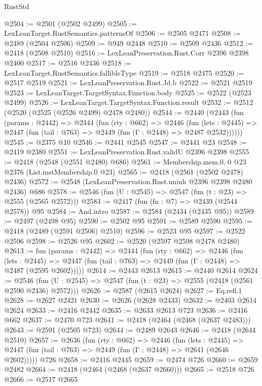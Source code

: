 \begin{lexlean}{RustStd}
\begin{coremodule}
@2504 := @2501 (@2502 @2499)
@2505 := LexLeanTarget.RustSemantics.patternsOf
@2506 := @2505 @2471
@2508 := @2489 (@2504 @2506)
@2509 := @949 @2448
@2510 := @2509 @2436
@2512 := @2418 (@2508 @2510)
@2516 := LexLeanPreservation.Rust.Corr @2396 @2398 @2400
@2517 := @2516 @2436
@2518 := LexLeanTarget.RustSemantics.fallibleType
@2519 := @2518 @2475
@2520 := @2517 @2519
@2521 := LexLeanPreservation.Rust.Jd.b
@2522 := @2521 @2519
@2523 := LexLeanTarget.TargetSyntax.Function.body
@2525 := @2522 (@2523 @2499)
@2526 := LexLeanTarget.TargetSyntax.Function.result
@2532 := @2512 (@2520 (@2525 (@2526 @2499) @2478 @2480))
@2544 := @2440
    (@2443
      (fun (params : @2442) =>
      @2444
        (fun (rty : @662) =>
        @2446
          (fun (lets : @2445) =>
          @2447 (fun (tail : @763) => @2449 (fun (Γ : @2448) => @2487 @2532))))))
@2545 := @2375 @10
@2546 := @2441 @2545
@2547 := @2441 @23
@2548 := @2419 @2380
@2551 := LexLeanPreservation.Rust.validU @2396 @2398
@2555 := @2418 (@2548 (@2551 @2480) @686)
@2561 := Membership.mem.{0, 0} @23 @2376 (List.instMembership.{0} @23)
@2565 := @2418 (@2561 (@2502 @2478) @2436)
@2572 := @2548 (LexLeanPreservation.Rust.uninh @2396 @2398 @2480 @2436) @686
@2578 := @2546 (fun (U : @2545) => @2547 (fun (t : @23) => @2555 (@2565 @2572)))
@2583 := @2417 (fun (fn : @7) => @2439 (@2544 @2578)) @95
@2584 := And.intro
@2587 := @2584 (@2434 (@2435 @95))
@2589 := @2497 (@2498 @95)
@2590 := @2502 @95
@2591 := @2589 @2590
@2595 := @2418 (@2489 (@2591 @2506) @2510)
@2596 := @2523 @95
@2597 := @2522 @2596
@2598 := @2526 @95
@2602 := @2520 (@2597 @2598 @2478 @2480)
@2613 := fun (params : @2442) =>
  @2444
    (fun (rty : @662) =>
    @2446
      (fun (lets : @2445) =>
      @2447 (fun (tail : @763) => @2449 (fun (Γ : @2448) => @2487 (@2595 @2602)))))
@2614 := @2443 @2613
@2615 := @2440 @2614
@2624 := @2546 (fun (U : @2545) => @2547 (fun (t : @23) => @2555 (@2418 (@2561 @2590 @2436) @2572)))
@2626 := @2587 (@2615 @2624)
@2627 := Eq.refl.{1}
@2628 := @2627 @2421
@2630 := @2626 (@2628 @2433)
@2632 := @2403 @2614 @2624
@2633 := @2416 @2442
@2635 := @2633 @2613 @723
@2636 := @2416 @662
@2637 := @2470 @723
@2641 := @2418 (@2464 (@2468 (@2637 @2483)))
@2643 := @2591 (@2505 @723)
@2644 := @2489 @2643
@2646 := @2418 (@2644 @2510)
@2657 := @2636
    (fun (rty : @662) =>
    @2446
      (fun (lets : @2445) =>
      @2447 (fun (tail : @763) => @2449 (fun (Γ : @2448) => @2641 (@2646 @2602)))))
    @726
@2658 := @2416 @2445
@2659 := @2474 @726
@2660 := @2659 @2482
@2664 := @2418 (@2464 (@2468 (@2637 @2660)))
@2665 := @2518 @726
@2666 := @2517 @2665

\end{coremodule}
\end{lexlean}
